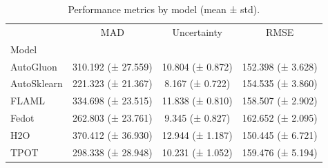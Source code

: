 \begin{table}
\caption{Performance metrics by model (mean ± std).}
\label{tab:summary_uncertainty}
\begin{tabular}{lccc}
\toprule
 & MAD & Uncertainty & RMSE \\
Model &  &  &  \\
\midrule
AutoGluon & 310.192 (± 27.559) & 10.804 (± 0.872) & 152.398 (± 3.628) \\
AutoSklearn & 221.323 (± 21.367) & 8.167 (± 0.722) & 154.535 (± 3.860) \\
FLAML & 334.698 (± 23.515) & 11.838 (± 0.810) & 158.507 (± 2.902) \\
Fedot & 262.803 (± 23.761) & 9.345 (± 0.827) & 162.652 (± 2.095) \\
H2O & 370.412 (± 36.930) & 12.944 (± 1.187) & 150.445 (± 6.721) \\
TPOT & 298.338 (± 28.948) & 10.231 (± 1.052) & 159.476 (± 5.194) \\
\bottomrule
\end{tabular}
\end{table}
